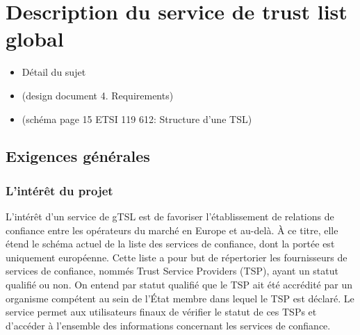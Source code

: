 \documentclass{tnreport}
\begin{document}
\section{Description du service de trust list global}

\begin{itemize}
\item Détail du sujet
\item (design document 4. Requirements)
\item (schéma page 15 ETSI 119 612: Structure d'une TSL)
\end{itemize}

\subsection{Exigences générales}

\subsubsection{L'intérêt du projet}

L'intérêt d'un service de 
gTSL 
est de favoriser l'établissement de relations de confiance entre les opérateurs du marché en Europe et au-delà. À ce titre, elle étend le schéma actuel de la liste des services de confiance, dont la portée est uniquement européenne. Cette liste a pour but de répertorier les fournisseurs de services de confiance, nommés Trust Service Providers (TSP), ayant un statut qualifié ou non. On entend par statut qualifié que le TSP ait été accrédité par un organisme compétent au sein de l’État membre dans lequel le TSP est déclaré. Le service permet aux utilisateurs finaux de vérifier le statut de ces TSPs et d'accéder à l'ensemble des informations concernant les services de confiance.

\end{document}
